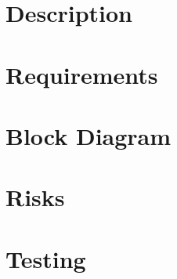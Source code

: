 \section{Description}
\section{Requirements}
\section{Block Diagram}
\section{Risks}
\section{Testing}
